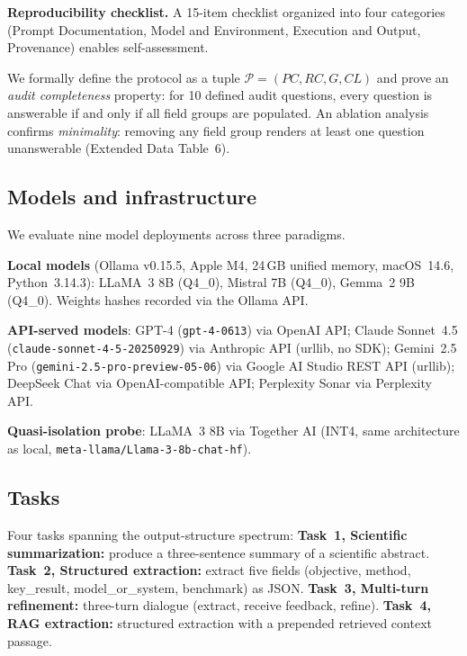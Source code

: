 \documentclass[sn-nature]{sn-jnl}
\begin{document}
\textbf{Reproducibility checklist.}
A 15-item checklist organized into four categories (Prompt Documentation, Model and Environment, Execution and Output, Provenance) enables self-assessment.

We formally define the protocol as a tuple $\mathcal{P} = (\mathit{PC}, \mathit{RC}, G, \mathit{CL})$ and prove an \emph{audit completeness} property: for 10 defined audit questions, every question is answerable if and only if all field groups are populated.
An ablation analysis confirms \emph{minimality}: removing any field group renders at least one question unanswerable (Extended Data Table~6).


\subsection{Models and infrastructure}\label{subsec:models}

We evaluate nine model deployments across three paradigms.

\textbf{Local models} (Ollama v0.15.5, Apple M4, 24\,GB unified memory, macOS~14.6, Python~3.14.3):
LLaMA~3 8B\cite{grattafiori2024llama3} (Q4\_0),
Mistral 7B\cite{jiang2023mistral} (Q4\_0),
Gemma~2 9B\cite{team2024gemma} (Q4\_0).
Weights hashes recorded via the Ollama API.

\textbf{API-served models}:
GPT-4 (\texttt{gpt-4-0613})\cite{achiam2023gpt4} via OpenAI API;
Claude Sonnet~4.5 (\texttt{claude-sonnet-4-5-20250929})\cite{anthropic2024claude} via Anthropic API (urllib, no SDK);
Gemini~2.5 Pro (\texttt{gemini-2.5-pro-preview-05-06})\cite{reid2024gemini15} via Google AI Studio REST API (urllib);
DeepSeek Chat via OpenAI-compatible API;
Perplexity Sonar via Perplexity API.

\textbf{Quasi-isolation probe}:
LLaMA~3 8B via Together AI (INT4, same architecture as local, \texttt{meta-llama/Llama-3-8b-chat-hf}).


\subsection{Tasks}\label{subsec:tasks}

Four tasks spanning the output-structure spectrum:
\textbf{Task~1, Scientific summarization:} produce a three-sentence summary of a scientific abstract.
\textbf{Task~2, Structured extraction:} extract five fields (objective, method, key\_result, model\_or\_system, benchmark) as JSON.
\textbf{Task~3, Multi-turn refinement:} three-turn dialogue (extract, receive feedback, refine).
\textbf{Task~4, RAG extraction:} structured extraction with a prepended retrieved context passage.
\end{document}
